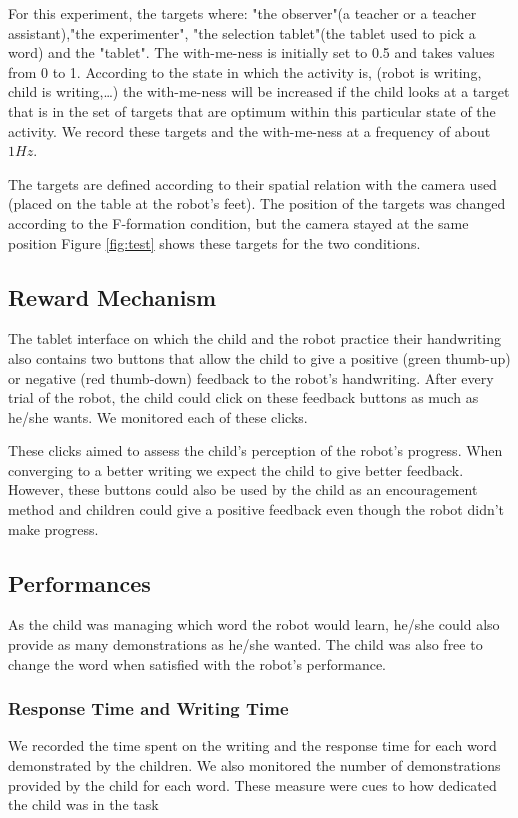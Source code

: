 \documentclass[letterpaper, 10 pt, conference]{ieeeconf}  %
\begin{document}
For this experiment, the targets where: "the observer"(a teacher or a teacher assistant),"the experimenter",  "the selection tablet"(the tablet used to pick a word) and the "tablet".
The with-me-ness is initially set to 0.5 and takes values from 0 to 1.
According to the state in which the activity is, (robot is writing, child is writing,\dots) the with-me-ness will be increased if the child looks at a target that is in the set of targets that are optimum within this particular state of the activity.
We record these targets and the with-me-ness at a frequency of about $1Hz$.


The targets are defined according to their spatial relation with the camera used (placed on the table at the robot's feet).
The position of the targets was changed according to the F-formation condition, but the camera stayed at the same position
Figure \ref{fig:test} shows these targets for the two conditions.


\subsection{Reward Mechanism}
The tablet interface on which the child and the robot practice their handwriting also contains two buttons that allow the child to give a positive (green thumb-up) or negative (red thumb-down) feedback to the robot's handwriting.
After every trial of the robot, the child could click on these feedback buttons as much as he/she wants.
We monitored each of these clicks.

These clicks aimed to assess the child's perception of the robot's progress.
When converging to a better writing we expect the child to give better feedback.
However, these buttons could also be used by the child as an encouragement method and children could give a positive feedback even though the robot didn't make progress.

\subsection{Performances}
As the child was managing which word the robot would learn, he/she could also provide as many demonstrations as he/she wanted.
The child was also free to change the word when satisfied with the robot's performance.

\subsubsection{Response Time and Writing Time}
We recorded the time spent on the writing and the response time for each word demonstrated by the children.
We also monitored the number of demonstrations provided by the child for each word.
These measure were cues to how dedicated the child was in the task 
\end{document}
